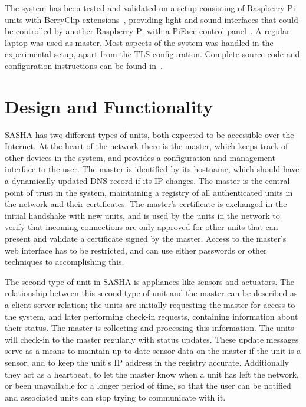 The system has been tested and validated on a setup consisting of Raspberry Pi units with BerryClip extensions~\cite{berryclip}, providing light and sound interfaces that could be controlled by another Raspberry Pi with a PiFace control panel~\cite{piface}. A regular laptop was used as master. Most aspects of the system was handled in the experimental setup, apart from the TLS configuration. Complete source code and configuration instructions can be found in~\cite[the source code repository]{sasha-source}.


\section{Design and Functionality}

SASHA has two different types of units, both expected to be accessible over the Internet. At the heart of the network there is the master, which keeps track of other devices in the system, and provides a configuration and management interface to the user. The master is identified by its hostname, which should have a dynamically updated DNS record if its IP changes. The master is the central point of trust in the system, maintaining a registry of all authenticated units in the network and their certificates. The master's certificate is exchanged in the initial handshake with new units, and is used by the units in the network to verify that incoming connections are only approved for other units that can present and validate a certificate signed by the master. Access to the master's web interface has to be restricted, and can use either passwords or other techniques to accomplishing this.

The second type of unit in SASHA is appliances like sensors and actuators. The relationship between this second type of unit and the master can be described as a client-server relation; the units are initially requesting the master for access to the system, and later performing check-in requests, containing information about their status. The master is collecting and processing this information. The units will check-in to the master regularly with status updates. These update messages serve as a means to maintain up-to-date sensor data on the master if the unit is a sensor, and to keep the unit's IP address in the registry accurate. Additionally they act as a heartbeat, to let the master know when a unit has left the network, or been unavailable for a longer period of time, so that the user can be notified and associated units can stop trying to communicate with it.

